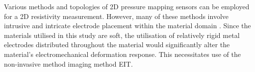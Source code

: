 
Various methods and topologies of 2D pressure mapping sensors can be employed for a 2D resistivity measurement. However, many of these methods involve intrusive and intricate electrode placement within the material domain \citep{Goncalves2017,Loew2019,Silvera-Tawil2015,Lee2019,Gilanizadehdizaj2022,Zhu2021}. Since the materials utilised in this study are soft, the utilisation of relatively rigid metal electrodes distributed throughout the material would significantly alter the material's electromechanical deformation response. This necessitates use of the non-invasive method imaging method EIT. 



